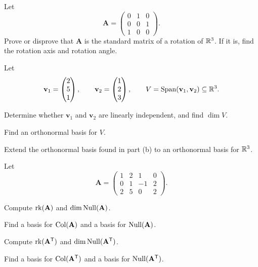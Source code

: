 \documentclass[11pt,oneside]{article}
\begin{document}
\begin{problem}
Let
\[
\mathbf A=
\begin{pmatrix}
0&1&0\\
0&0&1\\
1&0&0
\end{pmatrix}.
\]
Prove or disprove that $\mathbf A$ is the standard matrix of a rotation of $\mathbb{R}^3$. If it is, find the rotation axis and rotation angle.
\end{problem}

\begin{problem}
Let
\[
\mathbf v_1=\begin{pmatrix}2\\5\\1\end{pmatrix},
\qquad
\mathbf v_2=\begin{pmatrix}1\\2\\3\end{pmatrix},
\qquad
V=\operatorname{Span}(\mathbf v_1,\mathbf v_2)\subseteq\mathbb{R}^3.
\]
\begin{problemsubparts}
\item Determine whether $\mathbf v_1$ and $\mathbf v_2$ are linearly independent, and find $\dim V$.
\item Find an orthonormal basis for $V$.
\item Extend the orthonormal basis found in part \textup{(b)} to an orthonormal basis for $\mathbb{R}^3$.
\end{problemsubparts}
\end{problem}

\begin{problem}
Let
\[
\mathbf A=
\begin{pmatrix}
1&2&1&0\\
0&1&-1&2\\
2&5&0&2
\end{pmatrix}.
\]
\begin{problemsubparts}
\item Compute $\operatorname{rk}(\mathbf A)$ and $\dim\operatorname{Null}(\mathbf A)$.
\item Find a basis for $\operatorname{Col}(\mathbf A)$ and a basis for $\operatorname{Null}(\mathbf A)$.
\item Compute $\operatorname{rk}(\mathbf A^{\mathsf T})$ and $\dim\operatorname{Null}(\mathbf A^{\mathsf T})$.
\item Find a basis for $\operatorname{Col}(\mathbf A^{\mathsf T})$ and a basis for $\operatorname{Null}(\mathbf A^{\mathsf T})$.
\end{problemsubparts}
\end{problem}
\end{document}
